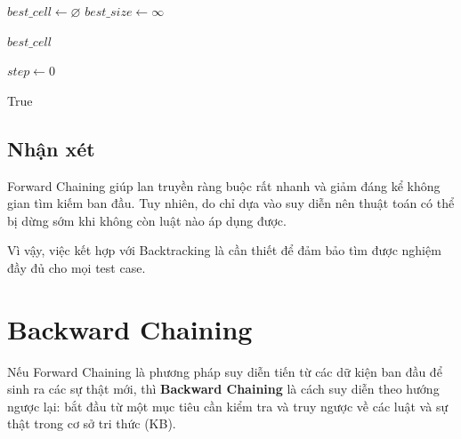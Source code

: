 \begin{algorithm}[H]
\footnotesize
\caption{Chọn biến theo MRV}

$best\_cell \leftarrow \varnothing$ \;
$best\_size \leftarrow \infty$ \;


\Return $best\_cell$ \;
\end{algorithm}

\begin{algorithm}[H]
\footnotesize
\caption{Propagation (Forward Checking)}

$step \leftarrow 0$ \;


\Return True \;
\end{algorithm}

\subsection{Nhận xét}

Forward Chaining giúp lan truyền ràng buộc rất nhanh và giảm đáng kể không gian tìm kiếm ban đầu. Tuy nhiên, do chỉ dựa vào suy diễn nên thuật toán có thể bị dừng sớm khi không còn luật nào áp dụng được.

Vì vậy, việc kết hợp với Backtracking là cần thiết để đảm bảo tìm được nghiệm đầy đủ cho mọi test case.


\section{Backward Chaining}

Nếu Forward Chaining là phương pháp suy diễn tiến từ các dữ kiện ban đầu để sinh ra các sự thật mới, thì \textbf{Backward Chaining} là cách suy diễn theo hướng ngược lại: bắt đầu từ một mục tiêu cần kiểm tra và truy ngược về các luật và sự thật trong cơ sở tri thức (KB).


